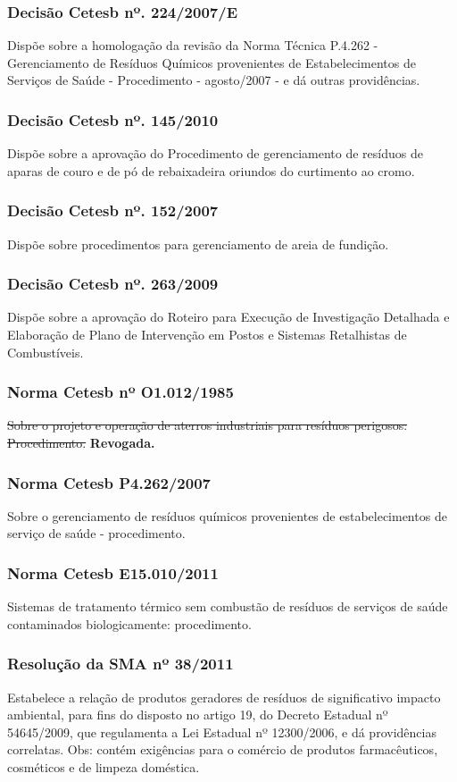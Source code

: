 \begin{subapend}
\begin{subsubapend}
		\subsubsection{Decisão Cetesb nº. 224/2007/E}
		Dispõe sobre a homologação da revisão da Norma Técnica P.4.262 - Gerenciamento de Resíduos Químicos provenientes de Estabelecimentos de Serviços de Saúde - Procedimento - agosto/2007 - e dá outras providências.
		\subsubsection{Decisão Cetesb nº. 145/2010}
		Dispõe sobre a aprovação do Procedimento de gerenciamento de resíduos de aparas de couro e de pó de rebaixadeira oriundos do curtimento ao cromo.
		\subsubsection{Decisão Cetesb nº. 152/2007}
		Dispõe sobre procedimentos para gerenciamento de areia de fundição.
		\subsubsection{Decisão Cetesb nº. 263/2009}
		Dispõe sobre a aprovação do Roteiro para Execução de Investigação Detalhada e Elaboração de Plano de Intervenção em Postos e Sistemas Retalhistas de Combustíveis.
		\subsubsection{Norma Cetesb nº O1.012/1985}
		\sout{Sobre o projeto e operação de aterros industriais para resíduos perigosos: Procedimento.} \textbf{Revogada.}
		\subsubsection{Norma Cetesb P4.262/2007}
		Sobre o gerenciamento de resíduos químicos provenientes de estabelecimentos de serviço de saúde - procedimento.
		\subsubsection{Norma Cetesb E15.010/2011}
		Sistemas de tratamento térmico sem combustão de resíduos de serviços de saúde contaminados biologicamente: procedimento.
		\subsubsection{Resolução da SMA nº 38/2011}
		Estabelece a relação de produtos geradores de resíduos de significativo impacto ambiental, para fins do disposto no artigo 19, do Decreto Estadual nº 54645/2009, que regulamenta a Lei Estadual nº 12300/2006, e dá providências correlatas. Obs: contém exigências para o comércio de produtos farmacêuticos, cosméticos e de limpeza doméstica.

\end{subsubapend}
\end{subapend}
